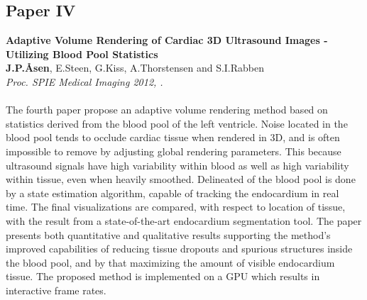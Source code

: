 \subsection{Paper IV}
\textbf{Adaptive Volume Rendering of Cardiac 3D Ultrasound Images - Utilizing Blood Pool Statistics}\\
\textbf{J.\:P.\:\AA{}sen}, E.\:Steen, G.\:Kiss, A.\:Thorstensen and S.\:I.\:Rabben\\
{\it Proc. SPIE Medical Imaging 2012, .}\\\\
The fourth paper propose an adaptive volume rendering method based on statistics derived from the blood pool of the left ventricle. Noise located in the blood pool tends to occlude cardiac tissue when rendered in 3D, and is often impossible to remove by adjusting global rendering parameters. This because ultrasound signals have high variability within blood as well as high variability within tissue, even when heavily smoothed. Delineated of the blood pool is done by a state estimation algorithm, capable of tracking the endocardium in real time. The final visualizations are compared, with respect to location of tissue, with the result from a state-of-the-art endocardium segmentation tool. The paper presents both quantitative and qualitative results supporting the method's improved capabilities of reducing tissue dropouts and spurious structures inside the blood pool, and by that maximizing the amount of visible endocardium tissue. The proposed method is implemented on a GPU which results in interactive frame rates.

